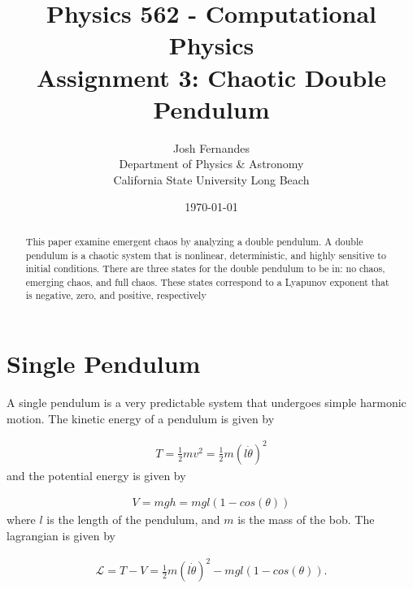 \documentclass[12pt]{article}
\begin{document}




\title{Physics 562 - Computational Physics\\[.5cm]
Assignment 3: Chaotic Double Pendulum}
\author{Josh Fernandes\\
Department of Physics \& Astronomy\\
California State University Long Beach}
\date{\today}

  
\maketitle



\begin{abstract}
This paper examine emergent chaos by analyzing a double pendulum. A double pendulum is a chaotic system that is nonlinear, deterministic, and highly sensitive to initial conditions. There are three states for the double pendulum to be in: no chaos, emerging chaos, and full chaos. These states correspond to a Lyapunov exponent that is negative, zero, and positive, respectively
\end{abstract}

\section{Single Pendulum}\label{s:intro}

A single pendulum is a very predictable system that undergoes simple harmonic motion. The kinetic energy of a pendulum is given by 

\begin{gather}
T=\frac{1}{2}mv^2=\frac{1}{2}m{(l\dot{\theta})}^2
\end{gather}
and the potential energy is given by

\begin{gather}
V=mgh=mgl(1 - cos(\theta))
\end{gather}
where $l$ is the length of the pendulum, and $m$ is the mass of the bob. The lagrangian is given by

\begin{gather}
\mathcal{L} = T - V = \frac{1}{2}m{(l\dot{\theta})}^2 - mgl(1 - cos(\theta)).
\end{gather}
\end{document}
